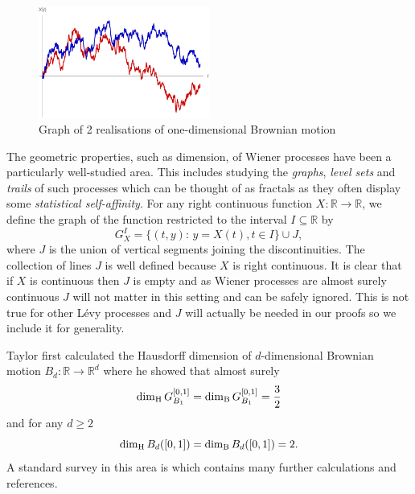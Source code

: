 \begin{figure}[h]
    \centering
	\includegraphics[width=0.5\textwidth]{pics/ch-brownian/wiener_process.pdf}
	\caption{\label{fig:brownianmotion}Graph of 2 realisations of one-dimensional Brownian motion}
\end{figure}

The geometric properties, such as dimension, of Wiener processes have been a particularly well-studied area. This includes studying the \emph{graphs}, \emph{level sets} and \emph{trails} of such processes which can be thought of as fractals as they often display some \emph{statistical self-affinity}. For any right continuous function $X:\mathbb{R}\to\mathbb{R}$, we define the graph of the function restricted to the interval $I \subseteq \mathbb{R}$ by
\[
G^{I}_{X}=\{(t,y) \colon \, y=X(t),t\in I\}\cup J,
\]
where $J$ is the union of vertical segments joining the discontinuities. The collection of lines $J$ is well defined because $X$ is right continuous. It is clear that if $X$ is continuous then $J$ is empty and as Wiener processes are almost surely continuous $J$ will not matter in this setting and can be safely ignored. This is not true for other L\'evy processes and $J$ will actually be needed in our proofs so we include it for generality.

Taylor \cite{taylor} first calculated the Hausdorff dimension of $d$-dimensional Brownian motion $B_d:\mathbb{R}\to\mathbb{R}^d$ where he showed that almost surely
\[
\dim_\text{H} G_{B_1}^{[0,1]} = \dim_{\textup{B}}  G_{B_1}^{[0,1]} = \frac{3}{2}         
\]
and for any $d\ge 2$
\[
\dim_\text{H} B_d([0,1]) = \dim_{\textup{B}} B_d([0,1]) =  2.
\]
A standard survey in this area is \cite{taylor-survey} which contains many further calculations and references.


